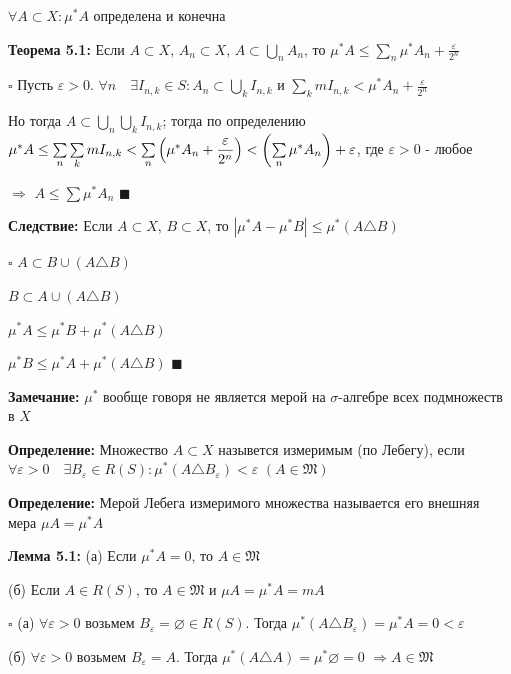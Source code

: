 \documentclass[a4paper]{report}
\newcommand*{\hm}[1]{#1\nobreak\discretionary{}%
            {\hbox{$\mathsurround=0pt #1$}}{}}
\begin{document}
$\forall A\subset X\colon\mu^*A$ определена и конечна
\bigskip

\noindent\textbf{Теорема 5.1:} Если $A\subset X$, $A_n\subset X$, $A\subset\bigcup\limits_n A_n$, то $\mu^*A\le
\sum\limits_n\mu^*A_n+\displaystyle\frac{\varepsilon}{2^n}$

\noindent $\square$ Пусть $\varepsilon>0$. $\forall n\quad\exists I_{n,k}\in S\colon A_n\subset\bigcup\limits_k I_{n,k}$
и $\sum\limits_k mI_{n,k}<\mu^*A_n+\displaystyle\frac{\varepsilon}{2^n}$

Но тогда $A\subset\bigcup\limits_n\bigcup\limits_k I_{n,k}$; тогда по определению $\mu^*A\le\sum\limits_n\sum\limits_k
mI_{n,k}\hm<\sum\limits_n\left(\mu^*A_n+\displaystyle\frac{\varepsilon}{2^n}\right)<\left(\sum\limits_n\mu^* A_n\right)+\varepsilon$, 
где $\varepsilon>0$ - любое

$\Rightarrow$ $A\le\sum\mu^*A_n$ $\blacksquare$
\bigskip

\noindent\textbf{Следствие:} Если $A\subset X$, $B\subset X$, то $|\mu^*A-\mu^*B|\le\mu^*(A\triangle B)$

\noindent $\square$ $A\subset B\cup(A\triangle B)$

$B\subset A\cup(A\triangle B)$

$\mu^*A\le\mu^*B+\mu^*(A\triangle B)$

$\mu^*B\le\mu^*A+\mu^*(A\triangle B)$ $\blacksquare$
\bigskip

\noindent\textbf{Замечание:} $\mu^*$ вообще говоря не является мерой на $\sigma$-алгебре всех подмножеств в $X$
\bigskip

\noindent\textbf{Определение:} Множество $A\subset X$ назывется измеримым (по Лебегу), если $\forall\varepsilon>0\quad
\exists B_\varepsilon\in R(S)\colon\mu^*(A\triangle B_\varepsilon)<\varepsilon$ $(A\in\mathfrak M)$
\bigskip

\noindent\textbf{Определение:} Мерой Лебега измеримого множества называется его внешняя мера $\mu A=\mu^*A$
\bigskip
\bigskip
\bigskip

\noindent\textbf{Лемма 5.1:} (а) Если $\mu^*A=0$, то $A\in\mathfrak M$

(б) Если $A\in R(S)$, то $A\in\mathfrak M$ и $\mu A=\mu^*A=mA$

\noindent $\square$ (а) $\forall\varepsilon>0$ возьмем $B_\varepsilon=\varnothing\in R(S)$. Тогда $\mu^*(A\triangle B_\varepsilon)=
\mu^*A=0<\varepsilon$

(б) $\forall\varepsilon>0$ возьмем $B_\varepsilon=A$. Тогда  $\mu^*(A\triangle A)=\mu^*\varnothing=0$ $\Rightarrow A\in\mathfrak M$
\end{document}
